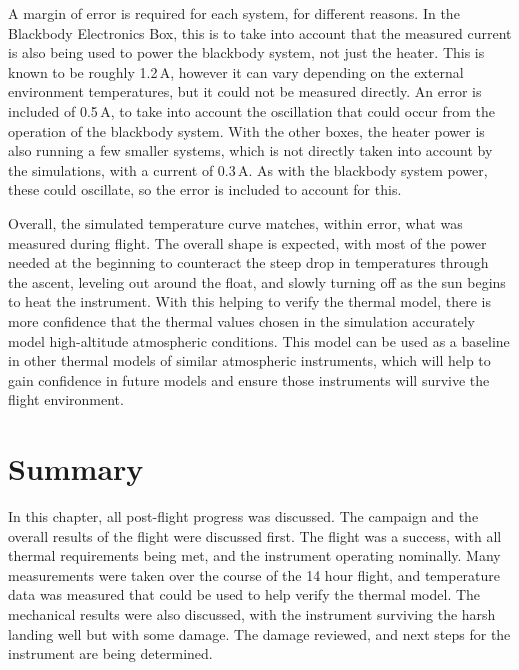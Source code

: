 A margin of error is required for each system, for different reasons. In the Blackbody Electronics Box, this is to take into account that the measured current is also being used to power the blackbody system, not just the heater. This is known to be roughly 1.2\,A, however it can vary depending on the external environment temperatures, but it could not be measured directly. An error is included of 0.5\,A, to take into account the oscillation that could occur from the operation of the blackbody system. With the other boxes, the heater power is also running a few smaller systems, which is not directly taken into account by the simulations, with a current of 0.3\,A. As with the blackbody system power, these could oscillate, so the error is included to account for this.

Overall, the simulated temperature curve matches, within error, what was measured during flight. The overall shape is expected, with most of the power needed at the beginning to counteract the steep drop in temperatures through the ascent, leveling out around the float, and slowly turning off as the sun begins to heat the instrument. With this helping to verify the thermal model, there is more confidence that the thermal values chosen in the simulation accurately model high-altitude atmospheric conditions. This model can be used as a baseline in other thermal models of similar atmospheric instruments, which will help to gain confidence in future models and ensure those instruments will survive the flight environment.

\section{Summary}
In this chapter, all post-flight progress was discussed. The campaign and the overall results of the flight were discussed first. The flight was a success, with all thermal requirements being met, and the instrument operating nominally. Many measurements were taken over the course of the 14 hour flight, and temperature data was measured that could be used to help verify the thermal model. The mechanical results were also discussed, with the instrument surviving the harsh landing well but with some damage. The damage reviewed, and next steps for the instrument are being determined.

